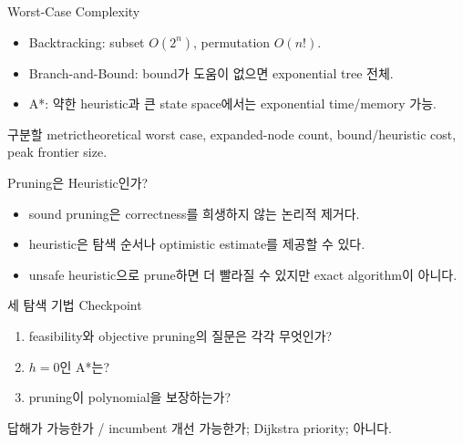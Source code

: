 \begin{frame}{Worst-Case Complexity}
\begin{itemize}
\item Backtracking: subset \(O(2^n)\), permutation \(O(n!)\).
\item Branch-and-Bound: bound가 도움이 없으면 exponential tree 전체.
\item A*: 약한 heuristic과 큰 state space에서는 exponential time/memory 가능.
\end{itemize}
\begin{block}{구분할 metric}theoretical worst case, expanded-node count, bound/heuristic cost, peak frontier size.\end{block}
\end{frame}
\begin{frame}{Pruning은 Heuristic인가?}
\begin{itemize}
\item sound pruning은 correctness를 희생하지 않는 논리적 제거다.
\item heuristic은 탐색 순서나 optimistic estimate를 제공할 수 있다.
\item unsafe heuristic으로 prune하면 더 빨라질 수 있지만 exact algorithm이 아니다.
\end{itemize}
\end{frame}
\begin{frame}{세 탐색 기법 Checkpoint}
\begin{enumerate}\item feasibility와 objective pruning의 질문은 각각 무엇인가?\item \(h=0\)인 A*는?\item pruning이 polynomial을 보장하는가?\end{enumerate}
\begin{exampleblock}{답}해가 가능한가 / incumbent 개선 가능한가; Dijkstra priority; 아니다.\end{exampleblock}
\end{frame}
